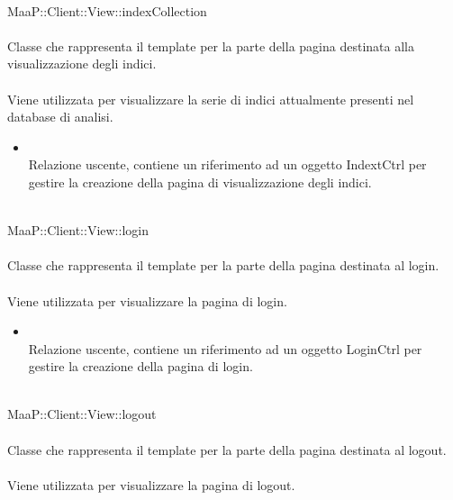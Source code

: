 \\
MaaP::Client::View::indexCollection\\
\\
Classe che rappresenta il template per la parte della pagina destinata alla visualizzazione degli indici.\\
\\
Viene utilizzata per visualizzare la serie di indici attualmente presenti nel database di analisi.\\
\begin{itemize}
\item{}\\
Relazione uscente, contiene un riferimento ad un oggetto IndextCtrl per gestire la creazione della pagina di visualizzazione degli indici.
\end{itemize}

\\
MaaP::Client::View::login\\
\\
Classe che rappresenta il template per la parte della pagina destinata al login.\\
\\
Viene utilizzata per visualizzare la pagina di login.\\
\begin{itemize}
\item{}\\
Relazione uscente, contiene un riferimento ad un oggetto LoginCtrl per gestire la creazione della pagina di login.
\end{itemize}

\\
MaaP::Client::View::logout\\
\\
Classe che rappresenta il template per la parte della pagina destinata al logout.\\
\\
Viene utilizzata per visualizzare la pagina di logout.\\

